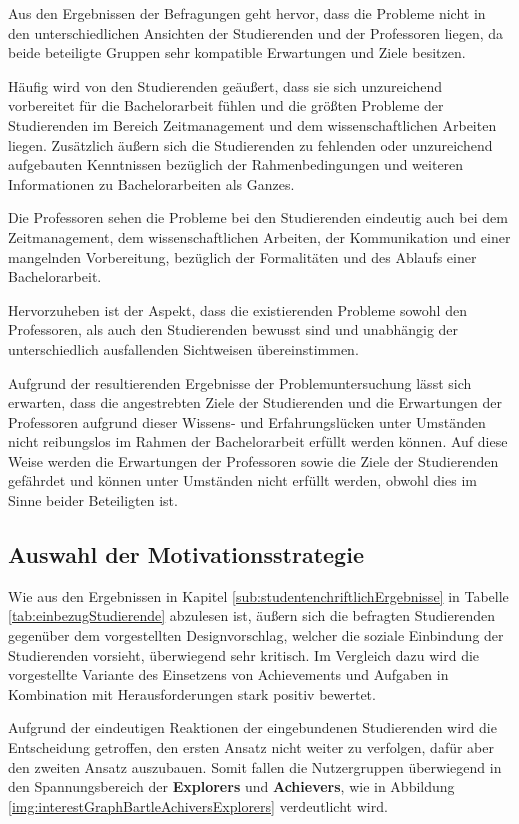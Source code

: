 \documentclass[bibliography=totoc,listof=totoc,BCOR=5mm,DIV=12,oneside]{scrbook}
\begin{document}
\par \bigskip Aus den Ergebnissen der Befragungen geht hervor, dass die Probleme nicht in den unterschiedlichen Ansichten der Studierenden und der Professoren liegen, da beide beteiligte Gruppen sehr kompatible Erwartungen und Ziele besitzen.

\par\bigskip Häufig wird von den Studierenden geäußert, dass sie sich unzureichend vorbereitet für die Bachelorarbeit fühlen und die größten Probleme der Studierenden im Bereich Zeitmanagement und dem wissenschaftlichen Arbeiten liegen. Zusätzlich äußern sich die Studierenden zu fehlenden oder unzureichend aufgebauten Kenntnissen bezüglich der Rahmenbedingungen und weiteren Informationen zu Bachelorarbeiten als Ganzes.

\par\bigskip Die Professoren sehen die Probleme bei den Studierenden eindeutig auch bei dem Zeitmanagement, dem wissenschaftlichen Arbeiten, der Kommunikation und einer mangelnden Vorbereitung, bezüglich der Formalitäten und des Ablaufs einer Bachelorarbeit.

\par\bigskip Hervorzuheben ist der Aspekt, dass die existierenden Probleme sowohl den Professoren, als auch den Studierenden bewusst sind und unabhängig der unterschiedlich ausfallenden Sichtweisen übereinstimmen.

\par\bigskip Aufgrund der resultierenden Ergebnisse der Problemuntersuchung lässt sich erwarten, dass die angestrebten Ziele der Studierenden und die Erwartungen der Professoren aufgrund dieser Wissens- und Erfahrungslücken unter Umständen nicht reibungslos im Rahmen der Bachelorarbeit erfüllt werden können. Auf diese Weise werden die Erwartungen der Professoren sowie die Ziele der Studierenden gefährdet und können unter Umständen nicht erfüllt werden, obwohl dies im Sinne beider Beteiligten ist.

\subsection{Auswahl der Motivationsstrategie}
\par Wie aus den Ergebnissen in Kapitel \ref{sub:studentenchriftlichErgebnisse} in Tabelle \ref{tab:einbezugStudierende} abzulesen ist, äußern sich die befragten Studierenden gegenüber dem vorgestellten Designvorschlag, welcher die soziale Einbindung der Studierenden vorsieht, überwiegend sehr kritisch. Im Vergleich dazu wird die vorgestellte Variante des Einsetzens von Achievements und Aufgaben in Kombination mit Herausforderungen stark positiv bewertet.
\par \bigskip Aufgrund der eindeutigen Reaktionen der eingebundenen Studierenden wird die Entscheidung getroffen, den ersten Ansatz nicht weiter zu verfolgen, dafür aber den zweiten Ansatz auszubauen. Somit fallen die Nutzergruppen überwiegend in den Spannungsbereich der \textbf{Explorers} und \textbf{Achievers}, wie in Abbildung \ref{img:interestGraphBartleAchiversExplorers} verdeutlicht wird. 
\end{document}
